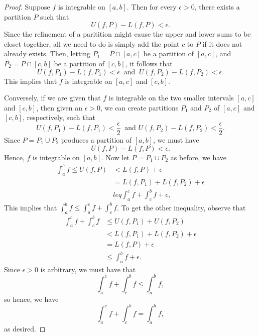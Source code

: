 \begin{proof}
	Suppose \( f \) is integrable on \( [a,b]  \). Then for every \( \epsilon > 0   \), there exists a partition \( P  \) such that 
	\[  U(f,P) - L(f,P) < \epsilon. \]
	Since the refinement of a paritition might cause the upper and lower sums to be closet together, all we need to do is simply add the point \( c  \) to \( P  \) if it does not already exists. Then, letting \( P_{1} = P \cap [a,c]  \) be a partition of \( [a,c]  \), and \( P_{2} = P \cap [c,b]  \) be a partition of \( [c,b]  \), it follows that 
	\[  U(f,P_{1}) - L(f, P_{1}) < \epsilon \ \text{ and } \ U(f, P_{2}) - L(f, P_{2}) < \epsilon. \] This implies that \( f  \) is integrable on \( [a,c]  \) and \( [c,b]  \).

	Conversely, if we are given that \( f  \) is integrable on the two smaller intervals \( [a,c]  \) and \( [c,b] \), then given an \( \epsilon > 0  \), we can create partitions \( P_{1}   \) and \( P_{2} \) of \( [a,c] \) and \( [c,b] \), respectively, such that 
	\[  U(f, P_{1}) - L(f, P_{1}) < \frac{ \epsilon  }{ 2  } \ \text{ and } U(f, P_{2}) - L(f,P_{2}) < \frac{ \epsilon  }{ 2 }.  \]
	Since \( P = P_{1} \cup P_{2}  \) produces a partition of \( [a,b]  \), we must have 
	\[ U(f, P) - L(f,P) < \epsilon.  \] Hence, \( f  \) is integrable on \( [a,b]  \).
	Now let \( P = P_{1} \cup P_{2} \) as before, we have 
	\begin{align*}
		\int_{ a }^{ b } f  \leq U(f, P) &< L(f, P)  + \epsilon  \\
										 &= L(f, P_{1}) + L(f, P_{2}) + \epsilon \\
										 &leq \int_{ a }^{ c } f  + \int_{ c }^{ b } f + \epsilon,
	\end{align*}
	This implies that \( \int_{ a }^{ b } f \leq \int_{ a }^{ c }f + \int_{ c }^{ b }  f \). To get the other inequality, observe that 
	\begin{align*}
	    \int_{ a }^{ c } f + \int_{ c }^{ b } f   &\leq U(f, P_{1}) + U(f, P_{2})  \\
												  &< L(f, P_{1}) + L(f, P_{2}) + \epsilon \\
												  &= L(f, P) + \epsilon \\
												  &\leq \int_{ a }^{ b } f + \epsilon.
	\end{align*}
	Since \( \epsilon > 0  \) is arbitrary, we must have that 
	\[  \int_{ a }^{ c } f + \int_{ c }^{ b } f \leq \int_{ a }^{ b } f, \]
	so hence, we have 
	\[  \int_{ a }^{ c } f  + \int_{ c }^{ b } f = \int_{ a }^{ b } f, \]
	as desired.
\end{proof}

